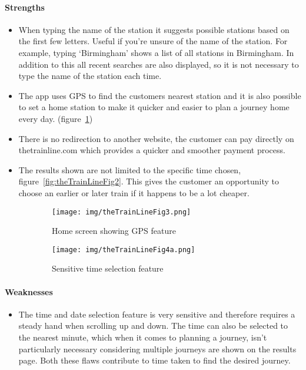 \paragraph{Strengths}

\begin{itemize}
	\item When typing the name of the station it suggests possible stations
		based on the first few letters. Useful if you're unsure of the name of
		the station. For example, typing `Birmingham' shows a list of all
		stations in Birmingham. In addition to this all recent searches are
		also displayed, so it is not necessary to type the name of the station
		each time.
	\item The app uses GPS to find the customers nearest station and it is also
		possible to set a home station to make it quicker and easier to plan a
		journey home every day. (figure~\ref{fig:thetrainline3})
	\item There is no redirection to another website, the customer can pay
		directly on thetrainline.com which provides a quicker and smoother
		payment process.
	\item The results shown are not limited to the specific time chosen,
		figure~\ref{fig:theTrainLineFig2}. This gives the customer an
		opportunity to choose an earlier or later train if it happens to be a
		lot cheaper.
\end{itemize}
\begin{figure}[ht]
	\centering
	\begin{subfigure}[b]{0.2\textwidth}
		\texttt{[image: img/theTrainLineFig3.png]}
		\caption{Home screen showing GPS feature}
	\end{subfigure}%
	\qquad
	\begin{subfigure}[b]{0.2\textwidth}
		\texttt{[image: img/theTrainLineFig4a.png]}
		\caption{Sensitive time selection feature}
	\end{subfigure}
	\caption{}\label{fig:thetrainline3}
\end{figure}

\paragraph{Weaknesses}
\begin{itemize}
	\item The time and date selection feature is very sensitive and therefore
		requires a steady hand when scrolling up and down. The time can also be
		selected to the nearest minute, which when it comes to planning a
		journey, isn't particularly necessary considering multiple journeys are
		shown on the results page. Both these flaws contribute to time taken to
		find the desired journey.
\end{itemize}

